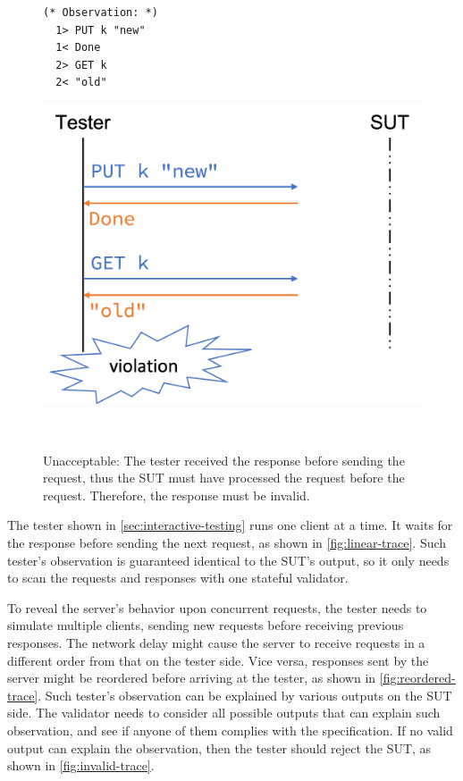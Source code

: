 \begin{figure}
  \centering
  \begin{minipage}[c]{.3\textwidth}
\begin{lstlisting}[style=customcoq]
  (* Observation: *)
  1> PUT k "new"
  1< Done
  2> GET k
  2< "old"
\end{lstlisting}
  \end{minipage}\begin{minipage}[c]{.4\textwidth}
  \includegraphics[width=\linewidth]{figures/invalid-trace}
  \end{minipage}\begin{minipage}[c]{.3\textwidth}\
  \end{minipage}
  \caption[Invalid trace that violates the specification.]{Unacceptable: The
    tester received the \ilc{Done} response before sending the 
    request, thus the SUT must have processed the \ilc{PUT} request before the
    \ilc{GET} request.  Therefore, the \ilc{"old"} response must be invalid.}
  \label{fig:invalid-trace}
\end{figure}
The tester shown in \autoref{sec:interactive-testing} runs one client at a time.
It waits for the response before sending the next request, as shown in
\autoref{fig:linear-trace}.  Such tester's observation is guaranteed identical
to the SUT's output, so it only needs to scan the requests and responses with
one stateful validator.

To reveal the server's behavior upon concurrent requests, the tester needs to
simulate multiple clients, sending new requests before receiving previous
responses.  The network delay might cause the server to receive requests in a
different order from that on the tester side.  Vice versa, responses sent by the
server might be reordered before arriving at the tester, as shown in
\autoref{fig:reordered-trace}.  Such tester's observation can be explained by
various outputs on the SUT side.  The validator needs to consider all possible
outputs that can explain such observation, and see if anyone of them complies
with the specification.  If no valid output can explain the observation, then
the tester should reject the SUT, as shown in \autoref{fig:invalid-trace}.

